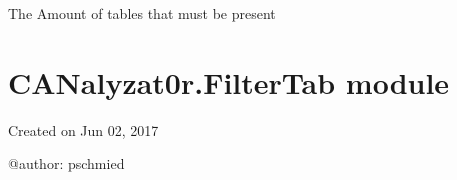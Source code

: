 \documentclass[letterpaper,10pt,english]{sphinxmanual}
\begin{document}
\begin{fulllineitems}

\begin{fulllineitems}
\label{\detokenize{src:src.Database.DatabaseStatements.projectTableNameColName}}
\end{fulllineitems}


\begin{fulllineitems}
\label{\detokenize{src:src.Database.DatabaseStatements.tableCount}}
The Amount of tables that must be present

\end{fulllineitems}


\end{fulllineitems}



\section{CANalyzat0r.FilterTab module}
\label{\detokenize{src:canalyzat0r-filtertab-module}}\label{\detokenize{src:module-src.FilterTab}}
Created on Jun 02, 2017

@author: pschmied
\end{document}
